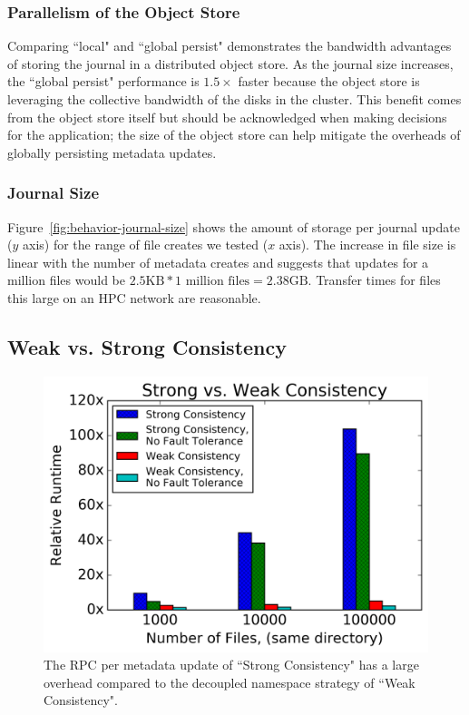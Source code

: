 \subsubsection{Parallelism of the Object Store} Comparing ``local" and ``global
persist" demonstrates the bandwidth advantages of storing the journal in a
distributed object store. As the journal size increases, the ``global persist"
performance is \(1.5\times\) faster because the object store is leveraging the
collective bandwidth of the disks in the cluster. This benefit comes from the
object store itself but should be acknowledged when making decisions for the
application; the size of the object store can help mitigate the overheads of
globally persisting metadata updates.

\subsubsection{Journal Size} Figure~\ref{fig:behavior-journal-size} shows the
amount of storage per journal update (\(y\) axis) for the range of file creates
we tested (\(x\) axis). The increase in file size is linear with the number of
metadata creates and suggests that updates for a million files would be
\(2.5\text{KB}*1\text{ million files} = 2.38\text{GB}\). Transfer times for
files this large on an HPC network are reasonable.

\subsection{Weak vs. Strong Consistency}
\begin{figure}[tb]
\centering
\includegraphics[width=1.0\linewidth]{graphs/slowdown-strong-v-weak.png}
\caption{The RPC per metadata update of ``Strong Consistency" has a large
overhead compared to the decoupled namespace strategy of ``Weak
Consistency".\label{fig:slowdown-strong-weak}}
\end{figure}

